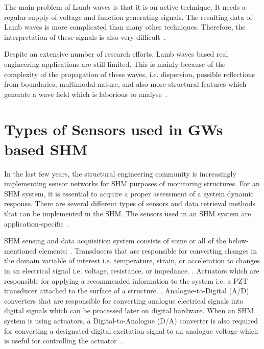 \documentclass[b5paper, 11pt, titlepage]{book}
\begin{document}
The main problem of Lamb waves is that it is an active technique. It needs a regular supply of voltage and function generating signals. The resulting data of Lamb waves is more complicated than many other techniques. Therefore, the interpretation of these signals is also very difficult~\cite{Kessler2002}.

Despite an extensive number of research efforts, Lamb waves based real engineering applications are still limited. This is mainly because of the complexity of the propagation of these waves, i.e. dispersion, possible reflections from boundaries, multimodal nature, and also more structural features which generate a wave field which is laborious to analyse~\cite{stepinski2013advanced}.

\section{Types of Sensors used in GWs based SHM}
In the last few years, the structural engineering community is increasingly implementing sensor networks for SHM purposes of monitoring structures. For an SHM system, it is essential to acquire a proper assessment of a system dynamic response. There are several different types of sensors and data retrieval methods that can be implemented in the SHM. The sensors used in an SHM system are application-specific~\cite{Farrar2012}.

SHM sensing and data acquisition system consists of some or all of the below-mentioned elements:
. Transducers that are responsible for converting changes in the domain variable of interest i.e. temperature, strain, or acceleration to changes in an electrical signal i.e. voltage, resistance, or impedance.
. Actuators which are responsible for applying a recommended information to the system i.e. a PZT transducer attached to the surface of a structure.
. Analogue-to-Digital (A/D) converters that are responsible for converting analogue electrical signals into digital signals which can be processed later on digital hardware. When an SHM system is using actuators, a Digital-to-Analogue (D/A) converter is also required for converting a designated digital excitation signal to an analogue voltage which is useful for controlling the actuator~\cite{Farrar2012}. 
\end{document}
